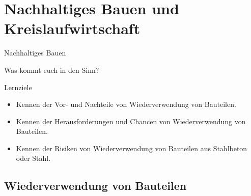\section{Nachhaltiges Bauen und Kreislaufwirtschaft}
\BlueSectionSlide



\begin{frame}{Nachhaltiges Bauen}
    \begin{block}{Was kommt euch in den Sinn?}
        
    \end{block}
\end{frame}






\begin{frame}{Lernziele}
    \begin{myLernziele}
        \begin{itemize}
            \item Kennen der Vor- und Nachteile von Wiederverwendung von Bauteilen.
            \item Kennen der Herausforderungen und Chancen von Wiederverwendung von Bauteilen. 
            \item Kennen der Risiken von Wiederverwendung von Bauteilen aus Stahlbeton oder Stahl.
        \end{itemize}
        

    \end{myLernziele}

\end{frame}


\subsection{Wiederverwendung von Bauteilen}


